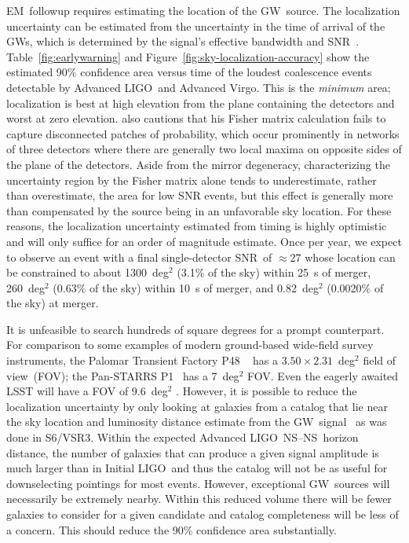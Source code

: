 \documentclass[preprint2]{aastex}
\newcommand{\NS}{NS}
\newcommand{\GW}{GW}%
\newcommand{\EM}{EM}%
\newcommand{\LIGO}{LIGO}%
\newcommand{\SNR}{SNR}%
\begin{document}
\EM\ followup requires estimating the location of the \GW\ source. The localization
uncertainty can be estimated from the uncertainty in the time of arrival of the \GW{}s,
which is determined by the signal's effective bandwidth and \SNR\
\citep{Fairhurst2009}.  Table~\ref{fig:earlywarning} and
Figure~\ref{fig:sky-localization-accuracy} show the estimated 90\%
confidence area versus time of the loudest coalescence events detectable by
Advanced \LIGO\ and Advanced Virgo.  This is the \emph{minimum} area; localization is best at high elevation
from the plane containing the detectors and worst at zero elevation.  \citeauthor{Fairhurst2009} also cautions that his Fisher matrix calculation fails to capture disconnected patches of probability, which occur prominently in networks of three detectors where there are generally two local maxima on opposite sides of the plane of the detectors.  Aside from the mirror degeneracy, characterizing the uncertainty region by the Fisher matrix alone tends to underestimate, rather than overestimate, the area for low SNR events, but this effect is generally more than compensated by the source being in an unfavorable sky location.  For these reasons, the localization uncertainty estimated from timing is highly optimistic and will only suffice for an order of magnitude estimate.  Once per year, we expect to observe an
event with a final single-detector \SNR\ of $\approx$27 whose location can be constrained to about
1300~deg$^2$ (3.1\% of the sky) within 25~s of merger,
260~deg$^2$ (0.63\% of the sky) within 10~s of merger, and
0.82~deg$^2$ (0.0020\% of the sky) at merger.

It is unfeasible to search hundreds of square degrees for a prompt counterpart.  For comparison to some examples of modern ground-based wide-field survey instruments, the Palomar Transient Factory P48 ~\citep{2010SPIE.7735E.122L} has a $3.50 \times 2.31$~deg$^2$ field of view~(FOV); the Pan-STARRS P1~\citep{2002SPIE.4836..154K} has a 7~deg$^2$ FOV.  Even the eagerly awaited LSST will have a FOV of 9.6~deg$^2$ \citep{2008arXiv0805.2366I}.  However, 
it is possible to reduce the localization uncertainty by only looking at
galaxies from a catalog that lie near the sky location and luminosity distance
estimate from the \GW\ signal~\citep{galaxy-catalog} as was done in S6/VSR3.
Within the expected Advanced \LIGO\ \NS--\NS\ horizon distance,
the number of galaxies that can produce a given signal amplitude is much larger
than in Initial \LIGO\ and thus the catalog will not be as useful
for downselecting pointings for most events. However, exceptional \GW\ sources will
necessarily be extremely nearby. Within this reduced volume there will be fewer
galaxies to consider for a given candidate and catalog completeness will be
less of a concern.  This should reduce the 90\% confidence area substantially.
\end{document}
